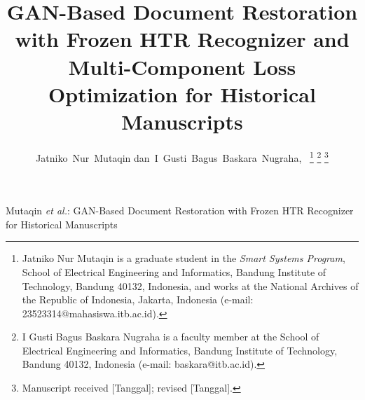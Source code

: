 \documentclass[journal]{IEEEtran}
\begin{document}
% 
\title{GAN-Based Document Restoration with Frozen HTR Recognizer and Multi-Component Loss Optimization for Historical Manuscripts}
% 
\author{Jatniko~Nur~Mutaqin
        dan~I~Gusti~Bagus~Baskara~Nugraha,~%
\thanks{Jatniko Nur Mutaqin is a graduate student in the \textit{Smart Systems Program}, School of Electrical Engineering and Informatics, Bandung Institute of Technology, Bandung 40132, Indonesia, and works at the National Archives of the Republic of Indonesia, Jakarta, Indonesia (e-mail: 23523314@mahasiswa.itb.ac.id).}%
\thanks{I Gusti Bagus Baskara Nugraha is a faculty member at the School of Electrical Engineering and Informatics, Bandung Institute of Technology, Bandung 40132, Indonesia (e-mail: baskara@itb.ac.id).}%
\thanks{Manuscript received [Tanggal]; revised [Tanggal].}}

% 
{Mutaqin \MakeLowercase{\textit{et al.}}: GAN-Based Document Restoration with Frozen HTR Recognizer for Historical Manuscripts}

\maketitle
\end{document}
